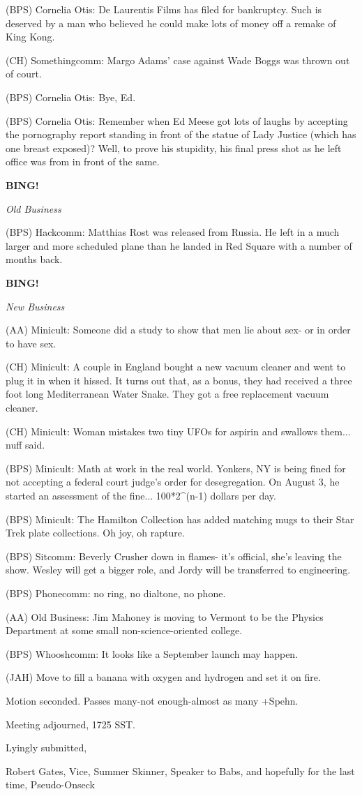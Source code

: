\documentclass[12pt]{article}
\newcommand{\bing}{{\bf BING!} }
\newcommand{\goto}[1]{\bing \vskip 12pt \centerline{{\em{#1}}}}
\begin{document}
(BPS) Cornelia Otis: De Laurentis Films has filed for bankruptcy. Such is deserved by a man who believed he could make lots of money off a remake of King Kong.

(CH) Somethingcomm: Margo Adams' case against Wade Boggs was thrown out of court.

(BPS) Cornelia Otis: Bye, Ed.

(BPS) Cornelia Otis: Remember when Ed Meese got lots of laughs by accepting the pornography report standing in front of the statue of Lady Justice (which has one breast exposed)? Well, to prove his stupidity, his final press shot as he left office was from in front of the same.

\goto{Old Business}

(BPS) Hackcomm: Matthias Rost was released from Russia. He left in a much larger and more scheduled plane than he landed in Red Square with a number of months back.

\goto{New Business}

(AA) Minicult: Someone did a study to show that men lie about sex- or in order to have sex.

(CH) Minicult: A couple in England bought a new vacuum cleaner and went to plug it in when it hissed. It turns out that, as a bonus, they had received a three foot long Mediterranean Water Snake. They got a free replacement vacuum cleaner.

(CH) Minicult: Woman mistakes two tiny UFOs for aspirin and swallows them... nuff said.

(BPS) Minicult: Math at work in the real world. Yonkers, NY is being fined for not accepting a federal court judge's order for desegregation. On August 3, he started an assessment of the fine... 100*2^(n-1) dollars per day.

(BPS) Minicult: The Hamilton Collection has added matching mugs to their Star Trek plate collections. Oh joy, oh rapture.

(BPS) Sitcomm: Beverly Crusher down in flames- it's official, she's leaving the show. Wesley will get a bigger role, and Jordy will be transferred to engineering.

(BPS) Phonecomm: no ring, no dialtone, no phone.

(AA) Old Business: Jim Mahoney is moving to Vermont to be the Physics Department at some small non-science-oriented college.

(BPS) Whooshcomm: It looks like a September launch may happen.

(JAH) Move to fill a banana with oxygen and hydrogen and set it on fire.

Motion seconded. Passes many-not enough-almost as many +Spehn.

\vspace{12pt}

\noindent
Meeting adjourned, 1725 SST.

\vspace{18pt}

\centerline{Lyingly submitted,}
\centerline{Robert Gates, Vice, Summer Skinner, Speaker to Babs, and hopefully for the last time, Pseudo-Onseck}
\end{document}

